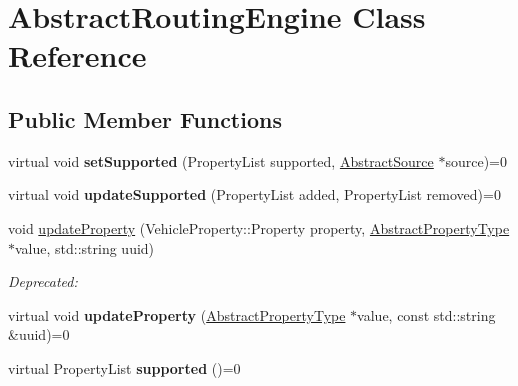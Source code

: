 \hypertarget{classAbstractRoutingEngine}{\section{Abstract\-Routing\-Engine Class Reference}
\label{classAbstractRoutingEngine}
}
\subsection*{Public Member Functions}
\begin{DoxyCompactItemize}
\item 
\hypertarget{classAbstractRoutingEngine_aa9df1ffc17c1764b46b996c5a2eb3a0f}{virtual void {\bfseries set\-Supported} (Property\-List supported, \hyperlink{classAbstractSource}{Abstract\-Source} $\ast$source)=0}\label{classAbstractRoutingEngine_aa9df1ffc17c1764b46b996c5a2eb3a0f}

\item 
\hypertarget{classAbstractRoutingEngine_a163f11dcd1464e30314af91f3d4d6507}{virtual void {\bfseries update\-Supported} (Property\-List added, Property\-List removed)=0}\label{classAbstractRoutingEngine_a163f11dcd1464e30314af91f3d4d6507}

\item 
\hypertarget{classAbstractRoutingEngine_adadf5f60f3895bdb90bb224d05ee97f0}{void \hyperlink{classAbstractRoutingEngine_adadf5f60f3895bdb90bb224d05ee97f0}{update\-Property} (Vehicle\-Property\-::\-Property property, \hyperlink{classAbstractPropertyType}{Abstract\-Property\-Type} $\ast$value, std\-::string uuid)}\label{classAbstractRoutingEngine_adadf5f60f3895bdb90bb224d05ee97f0}

\begin{DoxyCompactList}\small\item\em Deprecated\-: \end{DoxyCompactList}\item 
\hypertarget{classAbstractRoutingEngine_a2395e520ddfd532959706a5122998fbb}{virtual void {\bfseries update\-Property} (\hyperlink{classAbstractPropertyType}{Abstract\-Property\-Type} $\ast$value, const std\-::string \&uuid)=0}\label{classAbstractRoutingEngine_a2395e520ddfd532959706a5122998fbb}

\item 
\hypertarget{classAbstractRoutingEngine_adcd80e2e3823af7101c5d1f7ff0c217c}{virtual Property\-List {\bfseries supported} ()=0}\label{classAbstractRoutingEngine_adcd80e2e3823af7101c5d1f7ff0c217c}


\end{DoxyCompactItemize}
